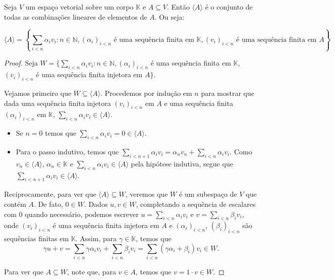 \begin{proposition}
    Seja $V$ um espaço vetorial sobre um corpo $\mathbb K$ e $A \subseteq V$.
    Então $\langle A\rangle$ é o conjunto de todas as combinações lineares de elementos de $A$.
    Ou seja:

    \begin{equation*}
        \langle A \rangle = \left\{\sum_{i<n} \alpha_i v_i : n \in \mathbb N, (\alpha_i)_{i<n} \text{ é uma sequência finita em } \mathbb K, (v_i)_{i<n} \text{ é uma sequência finita em } A\right\}.
    \end{equation*}
\end{proposition}
\begin{proof}
    Seja $W=\{\sum_{i<n} \alpha_i v_i : n \in \mathbb N, (\alpha_i)_{i<n}$ é uma sequência finita em $\mathbb K$, $(v_i)_{i<n}$ é uma sequência finita injetora em $A\}.$

    Vejamos primeiro que $W\subseteq \langle A\rangle$.
    Procedemos por indução em $n$ para mostrar que dada uma sequência finita injetora $(v_i)_{i<n}$ em $A$ e uma sequência finita $(\alpha_i)_{i<n}$ em $\mathbb K$, $\sum_{i<n} \alpha_i v_i \in \langle A\rangle$.
    \begin{itemize} 
    \item Se $n=0$ temos que $\sum_{i<n} \alpha_i v_i = 0 \in \langle A\rangle$.
    \item Para o passo indutivo, temos que $\sum_{i<n+1} \alpha_i v_i = \alpha_n v_n + \sum_{i<n} \alpha_i v_i$.
    Como $v_n \in \langle A\rangle$, $\alpha_n \in \mathbb K$ e $\sum_{i<n} \alpha_i v_i \in \langle A\rangle$ pela hipótese indutiva, segue que $\sum_{i<n+1} \alpha_i v_i \in \langle A\rangle$.
    \end{itemize}

    Reciprocamente, para ver que $\langle A\rangle \subseteq W$, veremos que $W$ é um subespaço de $V$ que contém $A$.
    De fato, $0 \in W$.
    Dados $u, v \in W$, completando a sequência de escalares com $0$ quando necessário, podemos escrever $u = \sum_{i<n} \alpha_i v_i$ e $v = \sum_{i<n} \beta_i v_i$, onde $(v_i)_{i<n}$ é uma sequência finita injetora em $A$ e $(\alpha_i)_{i<n}$, $(\beta_i)_{i<n}$ são sequências finitas em $\mathbb K$.
    Assim, para $\gamma \in \mathbb K$, temos que
    \begin{equation*}
        \gamma u + v = \sum_{i<n} \gamma \alpha_i v_i + \sum_{i<n} \beta_i v_i = \sum_{i<n} (\gamma \alpha_i + \beta_i) v_i \in W.
    \end{equation*}

    Para ver que $A \subseteq W$, note que, para $v \in A$, temos que $v = 1 \cdot v \in W$.
\end{proof}

